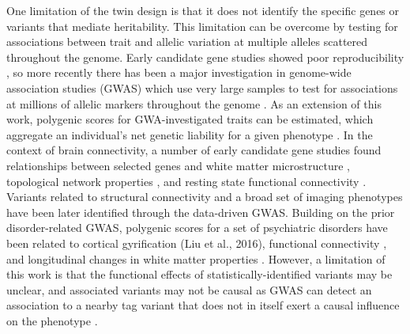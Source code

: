 One limitation of the twin design is that it does not identify the specific genes or variants that mediate heritability. This limitation can be overcome by testing for associations between trait and allelic variation at multiple alleles scattered throughout the genome. Early candidate gene studies showed poor reproducibility \citep{Hutchison2004,Sullivan2007}, so more recently there has been a major investigation in genome-wide association studies (GWAS) which use very large samples to test for associations at millions of allelic markers throughout the genome \citep{Bush2012}. As an extension of this work, polygenic scores for GWA-investigated traits can be estimated, which aggregate an individual’s net genetic liability for a given phenotype \citep{Torkamani2018}. In the context of brain connectivity, a number of early candidate gene studies found relationships between selected genes and white matter microstructure \citep{Braskie2012,Chiang2011,Jahanshad2012b}, topological network properties \citep{Dennis2011}, and resting state functional connectivity \citep{Filippini2009,Trachtenberg2012,Westlye2011}. Variants related to structural connectivity \citep{Chiang2009,Jahanshad2012a,Jahanshad2013} and a broad set of imaging phenotypes \citep{Elliott2018} have been later identified through the data-driven GWAS. Building on the prior disorder-related GWAS, polygenic scores for a set of psychiatric disorders have been related to cortical gyrification (Liu et al., 2016), functional connectivity \citep{Dezhina2018,Sadeh2018,Wang2017}, and longitudinal changes in white matter properties \citep{Alloza2018}. However, a limitation of this work is that the functional effects of statistically-identified variants may be unclear, and associated variants may not be causal as GWAS can detect an association to a nearby tag variant that does not in itself exert a causal influence on the phenotype \citep{Wang2010}. 

